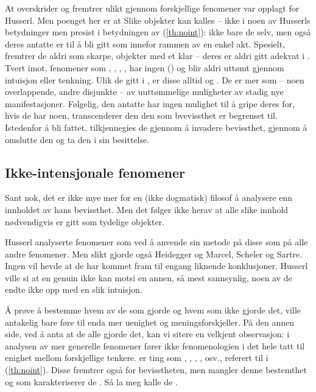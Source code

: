 At  overskrider  og 
fremtrer ulikt gjennom forskjellige fenomener var opplagt for Husserl. 
Men poenget her er at
%
% 
Slike objekter kan kalles  -- ikke i noen av 
Husserls betydninger men presist i betydningen av (\ref{th:noint}): ikke 
bare de selv, men ogs{\aa} deres antatte  er  til {\aa} bli  gitt som  
innefor rammen av en enkel akt. Spesielt, fremtrer de aldri som 
skarpe,  objekter med et klar 
 -- deres  er aldri gitt adekvat 
i . Tvert imot, fenomener som , 
, , , har ingen 
 () og blir aldri utt{\o}mt gjennom 
intuisjon eller tenkning. Ulik de  gitt i 
, er disse alltid  og . 
De er mer som  -- noen overlappende, andre disjunkte -- av 
uutt{\o}mmelige muligheter av stadig nye manifestasjoner. 
F{\o}lgelig, den antatte  har 
ingen mulighet til {\aa} gripe deres  for, hvis de har 
noen, transcenderer den den  som bvevissthet er begrenset 
til. Istedenfor {\aa} bli fattet, tilkjennegies de gjennom {\aa} 
invadere bevissthet, gjennom {\aa} omslutte den og ta den i sin 
besittelse.

\subsection{Ikke-intensjonale fenomener}
Sant nok, det er ikke mye mer for en (ikke dogmatisk) filosof {\aa} 
analysere enn innholdet av hans bevissthet. Men det f{\o}lger ikke 
herav at alle slike innhold n{\o}dvendigvis er gitt som tydelige objekter.

Husserl analyserte fenomener som  ved {\aa} anvende 
sin metode p{\aa} disse som p{\aa} alle andre fenomener. Men slikt 
gjorde ogs{\aa} Heidegger og Marcel, Scheler og Sartre. Ingen vil 
hevde at de har kommet fram til engang liknende konklusjoner. Husserl 
ville si at en genuin  ikke kan motsi en annen, 
s{\aa} mest sannsynlig, noen av de endte ikke opp med en slik intuisjon.

{\AA} pr{\o}ve {\aa} bestemme hvem av de som gjorde og hvem som ikke 
gjorde det, ville antakelig bare f{\o}re til enda mer uenighet og 
meningsforskjeller. P{\aa} den annen side, ved {\aa} anta at de alle 
gjorde det, kan vi sitere en velkjent observasjon: i analysen av mer 
generelle fenomener f{\o}rer ikke fenomenologien i det hele tatt til 
enighet mellom forskjellige tenkere.  er 
ting som , , , , 
osv., referert til i (\ref{th:noint}). 
Disse fremtrer ogs{\aa} for bevisstheten, men mangler denne 
bestemthet og  som karakteriserer de . S{\aa} la meg kalle de .

